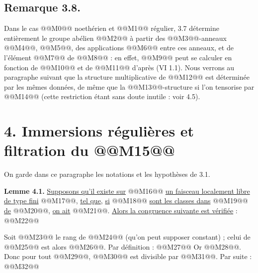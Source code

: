 
\subsection*{Remarque 3.8.}

Dans le cas @@M0@@ noethérien et @@M1@@ régulier, 3.7 détermine entièrement le groupe abélien @@M2@@ à partir des @@M3@@-anneaux @@M4@@, @@M5@@, des applications @@M6@@ entre ces anneaux, et de l'élément @@M7@@ de @@M8@@ : en effet, @@M9@@ peut se calculer en fonction de @@M10@@ et de @@M11@@ d'après (VI 1.1). Nous verrons au paragraphe suivant que la structure multiplicative de @@M12@@ est déterminée par les mêmes données, de même que la @@M13@@-structure si l'on tensorise par @@M14@@ (cette restriction étant sans doute inutile : voir 4.5).

\section*{4. Immersions régulières et filtration du @@M15@@}

On garde dans ce paragraphe les notations et les hypothèses de 3.1.

\textbf{Lemme 4.1.} \uline{Supposons qu'il existe sur} @@M16@@ \uline{un faisceau localement libre de type fini} @@M17@@, \uline{tel que}, \uline{si} @@M18@@ \uline{sont les classes dans} @@M19@@ \uline{de} @@M20@@, \uline{on ait} @@M21@@. \uline{Alors la congruence suivante est vérifiée} :
@@M22@@

Soit @@M23@@ le rang de @@M24@@ (qu'on peut supposer constant) ; celui de @@M25@@ est alors @@M26@@. Par définition :
@@M27@@
Or @@M28@@. Donc pour tout @@M29@@, @@M30@@ est divisible par @@M31@@. Par suite :
@@M32@@
